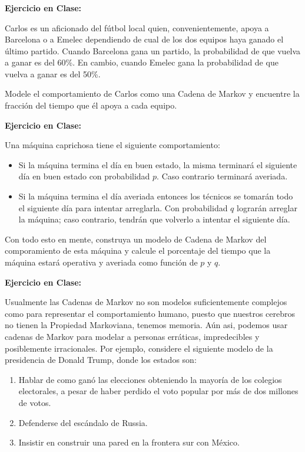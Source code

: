 \documentclass[ 10pt, xcolor = dvipsnames]{beamer}
\begin{document}
\begin{frame}[allowframebreaks]
\frametitle{\insertsubsection}

\textbf{Ejercicio en Clase:}

Carlos es un aficionado del f\'utbol local quien, convenientemente, apoya a Barcelona o a Emelec dependiendo de cual de los dos equipos haya ganado el \'ultimo partido. Cuando Barcelona gana un partido, la probabilidad de que vuelva a ganar es del 60\%. En cambio, cuando Emelec gana la probabilidad de que vuelva a ganar es del 50\%. 

Modele el comportamiento de Carlos como una Cadena de Markov y encuentre la fracci\'on del tiempo que \'el apoya a cada equipo. 

\framebreak

\textbf{Ejercicio en Clase:}

Una m\'aquina caprichosa tiene el siguiente comportamiento: 
\begin{itemize}
\item Si la m\'aquina termina el d\'ia en buen estado, la misma terminar\'a el siguiente d\'ia en buen estado con probabilidad $p$. Caso contrario terminar\'a averiada. 
\item Si la m\'aquina termina el d\'ia averiada entonces los t\'ecnicos se tomar\'an todo el siguiente d\'ia para intentar arreglarla. Con probabilidad $q$ lograr\'an arreglar la m\'aquina; caso contrario, tendr\'an que volverlo a intentar el siguiente d\'ia. 
\end{itemize}

Con todo esto en mente, construya un modelo de Cadena de Markov del comporamiento de esta m\'aquina y calcule el porcentaje del tiempo que la m\'aquina estar\'a operativa y averiada como funci\'on de $p$ y $q$. 

\framebreak

\textbf{Ejercicio en Clase:}

Usualmente las Cadenas de Markov no son modelos suficientemente complejos como para representar el comportamiento humano, puesto que nuestros cerebros no tienen la Propiedad Markoviana, \ie tenemos memoria. A\'un asi, podemos usar cadenas de Markov para modelar a personas err\'aticas, impredecibles y posiblemente irracionales. Por ejemplo, considere el siguiente modelo de la presidencia de Donald Trump, donde los estados son: 
\begin{enumerate}
\item Hablar de como gan\'o las elecciones obteniendo la mayor\'ia de los colegios electorales, \linebreak a pesar de haber perdido el voto popular por m\'as de dos millones de votos. 
\item Defenderse del esc\'andalo de Russia. 
\item Insistir en construir una pared en la frontera sur con M\'exico. 
\framebreak


\end{enumerate}
\end{frame}
\end{document}

